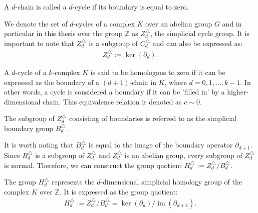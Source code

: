\begin{definition}[$d$-cycle]{\cite[\S 2, p.106]{hatcher2005algebraic}}
	A $d$-chain is called a $d$-cycle if its boundary is equal to zero.
\end{definition}

We denote the set of \( d \)-cycles of a complex \( K \) over an abelian group $G$ and in particular in this thesis over the group \( \mathbb{Z} \) as \( Z^{\triangle}_{d} \), the simplicial cycle group. It is important to note that \( Z^{\triangle}_{d} \) is a subgroup of \( C^{\triangle}_{d} \) and can also be expressed as:
\begin{align}
	Z^{\triangle}_{d} := \ker(\partial_{d}). 
\end{align}

A \( d \)-cycle of a \( k \)-complex \( K \) is said to be homologous to zero if it can be expressed as the boundary of a \( (d+1) \)-chain in \( K \), where \( d = 0, 1, \ldots, k-1 \). In other words, a cycle is considered a boundary if it can be 'filled in' by a higher-dimensional chain. This equivalence relation is denoted as \( c \sim 0 \).

\begin{definition}{\cite[\S 2.3]{zomorodian2004computing}}
	The subgroup of $Z^{\triangle}_{d}$ consisting of boundaries is referred to as the simplicial boundary group $B^{\triangle}_{d}$.
\end{definition}

It is worth noting that \( B^{\triangle}_{d} \) is equal to the image of the boundary operator \( \partial_{d+1} \). Since \( B^{\triangle}_{d} \) is a subgroup of \( Z^{\triangle}_{d} \) and \( Z^{\triangle}_{d} \) is an abelian group, every subgroup of \( Z^{\triangle}_{d} \) is normal. Therefore, we can construct the group quotient $H^{\triangle}_{d} := Z^{\triangle}_{d} / B^{\triangle}_{d}$. 

\begin{definition}{\cite[\S 2, p.106]{hatcher2005algebraic}} 
	The group \( H^{\triangle}_{d} \) represents the \( d \)-dimensional simplicial homology group of the complex \( K \) over \( \mathbb{Z} \). It is expressed as the group quotient:
	\begin{align}
		H^{\triangle}_{d} := Z^{\triangle}_{d} / B^{\triangle}_{d} = \ker(\partial_{d}) / \operatorname{im}(\partial_{d+1}). 
	\end{align}
\end{definition}

